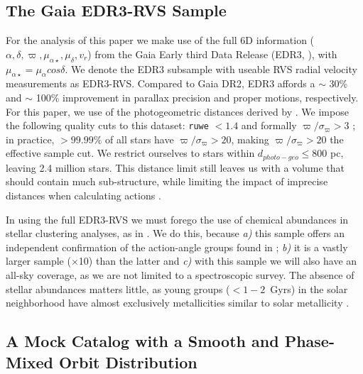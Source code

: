 \documentclass[twocolumn]{aastex631}
\begin{document}
\subsection{The Gaia EDR3-RVS Sample}

For the analysis of this paper we make use of the full 6D information ($\alpha, \delta, \varpi, \mu_{\alpha\star}, \mu_{\delta}, v_{r}$) from the Gaia Early third Data Release (EDR3, \citet{2020arXiv201203380L}), with $\mu_{\alpha\star}=\mu_{\alpha}cos\delta$. We denote the EDR3 subsample with useable RVS radial velocity measurements as EDR3-RVS. 
Compared to Gaia DR2, EDR3 affords a $\sim$ 30\% and $\sim$ 100\% improvement in parallax precision and proper motions, respectively. For this paper, we use of the photogeometric distances derived by \citet{2020arXiv201205220B}. We impose the following quality cuts to this dataset: \texttt{ruwe} $< 1.4$ and formally $\varpi/\sigma_\varpi > 3$ \citep{2020arXiv201206242F}; in practice, $> 99.99\%$ of all stars have $\varpi/\sigma_\varpi > 20$, making $\varpi/\sigma_\varpi > 20$ the effective sample cut.
We restrict ourselves to stars within $d_{photo-geo} \leq 800$ pc, leaving 2.4 million stars. This distance limit still leaves us with a volume that should contain much sub-structure, while limiting the impact of imprecise distances when calculating actions \citep{2018MNRAS.481.2970C}. 

In using the full EDR3-RVS we must forego the use of chemical abundances in stellar clustering analyses, as in \citet{2020MNRAS.495.4098C}. We do this, because \textit{a)} this sample offers an independent confirmation of the action-angle groups found in \citet{2020MNRAS.495.4098C}; \textit{b)} it is a vastly larger sample ($\times$10) than the latter and \textit{c)} with this sample we will also have an all-sky coverage, as we are not limited to a spectroscopic survey. The absence of stellar abundances matters little, as young groups ($<1-2$~Gyrs) in the solar neighborhood have almost exclusively metallicities similar to solar metallicity \citep{2017A&A...601A..70S}.

\subsection{A Mock Catalog with a Smooth and Phase-Mixed Orbit Distribution}
\label{sec:gaia_mock}
\end{document}
